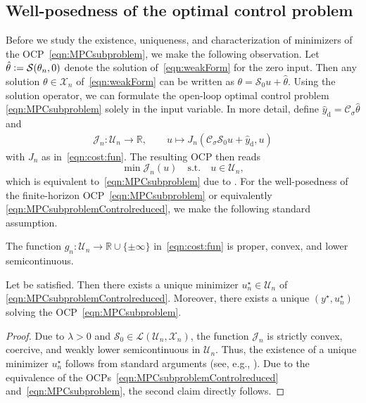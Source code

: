 \documentclass[reqno]{amsart}
\newcommand{\Li}{\mathcal{L}}
\newcommand{\X}{{\mathscr X}}
\newcommand{\U}{{\mathscr U}}
\newcommand{\R}{\mathbb R}
\newcommand{\state}{\theta}
\newcommand{\desired}[1]{#1_{\mathrm{d}}}
\newcommand{\inpVar}{u}
\newcommand{\outVar}{y}
\newcommand{\hatoutVarDes}{\desired{\hat y}}
\newcommand{\cOper}{\calC}
\newcommand{\solOper}{\calS_{0}}
\newcommand{\solper}{\calS}
\newcommand{\optInpVar}[1]{\inpVar_{#1}^\star}
\newcommand{\optInpVarN}{\optInpVar{n}}
\newcommand{\optOutVar}{\outVar^\star}
\newcommand{\switch}{\sigma}
\newcommand{\Jhat}{\calJ}
\newcommand{\calC}{\mathcal{C}}
\newcommand{\calJ}{\mathcal{J}}
\newcommand{\calS}{\mathcal{S}}
\newcommand{\abbr}[1]{\textsf{#1}\xspace}
\newcommand{\OCP}{\abbr{OCP}}
\newcommand{\OCPs}{\abbr{OCPs}}
\begin{document}
\subsection{Well-posedness of the optimal control problem}
\label{subsec:optimalControl}
%
Before we study the existence, uniqueness, and characterization of minimizers of the \OCP~\eqref{eqn:MPCsubproblem}, we make the following observation. Let $\hat{\state} \vcentcolon= \solper(\state_n,0)$ denote the solution of~\eqref{eqn:weakForm} for the zero input. Then any solution $\state\in\X_n$ of~\eqref{eqn:weakForm} can be written as $\state = \solOper\inpVar + \hat{\state}$.
%
Using the solution operator, we can formulate the open-loop optimal control problem \eqref{eqn:MPCsubproblem} solely in the input variable. In more detail, define $\hatoutVarDes=\cOper_\switch\hat \state$ and
\begin{align*}
    \Jhat_n\colon\U_n\to \R,\qquad \inpVar \mapsto J_n(\cOper_{\switch}\solOper\inpVar+\hatoutVarDes,\inpVar)
\end{align*}
with $J_n$ as in~\eqref{eqn:cost:fun}. The resulting \OCP then reads
\begin{equation}
    \label{eqn:MPCsubproblemControlreduced}
    \min \Jhat_n(\inpVar)\quad\text{s.t.}\quad\inpVar\in \U_n,
\end{equation}
which is equivalent to~\eqref{eqn:MPCsubproblem} due to .
%
For the well-posedness of the finite-horizon \OCP~\eqref{eqn:MPCsubproblem} or equivalently \eqref{eqn:MPCsubproblemControlreduced}, we make the following standard assumption.
%
\begin{assumption}
	\label{ass:propertiesG}
	The function $g_n\colon\U_n\to \R\cup \{\pm \infty \}$ in~\eqref{eqn:cost:fun} is proper, convex, and lower semicontinuous.
\end{assumption}
%
\begin{theorem}[Unique solution of the \OCP]
    \label{thm:wellPosednessOCP}
    Let  be satisfied. Then there exists a unique minimizer $\optInpVarN \in \U_n$ of \eqref{eqn:MPCsubproblemControlreduced}. Moreover, there exists a unique $(\optOutVar,\optInpVarN)$ solving the \OCP~\eqref{eqn:MPCsubproblem}.
\end{theorem}
%
\begin{proof}
    Due to $\lambda>0$ and $\solOper\in\Li(\U_n,\X_n)$, the function $\Jhat_n$ is strictly convex, coercive, and weakly lower semicontinuous in $\U_n$. Thus, the existence of a unique minimizer $\optInpVarN$ follows from standard arguments (see, e.g., \cite[Thm.~2.14]{troltzsch2024optimal}).
    Due to the equivalence of the \OCPs~\eqref{eqn:MPCsubproblemControlreduced} and~\eqref{eqn:MPCsubproblem}, the second claim directly follows.
\end{proof}
\end{document}
